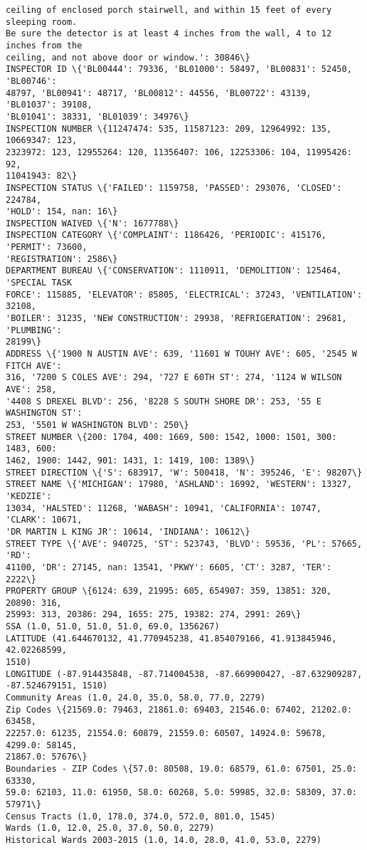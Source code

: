 \documentclass[11pt]{article}
\begin{document}
\begin{Verbatim}[commandchars=\\\{\}]
ceiling of enclosed porch stairwell, and within 15 feet of every sleeping room.
Be sure the detector is at least 4 inches from the wall, 4 to 12 inches from the
ceiling, and not above door or window.': 30846\}
INSPECTOR ID \{'BL00444': 79336, 'BL01000': 58497, 'BL00831': 52450, 'BL00746':
48797, 'BL00941': 48717, 'BL00812': 44556, 'BL00722': 43139, 'BL01037': 39108,
'BL01041': 38331, 'BL01039': 34976\}
INSPECTION NUMBER \{11247474: 535, 11587123: 209, 12964992: 135, 10669347: 123,
2323972: 123, 12955264: 120, 11356407: 106, 12253306: 104, 11995426: 92,
11041943: 82\}
INSPECTION STATUS \{'FAILED': 1159758, 'PASSED': 293076, 'CLOSED': 224784,
'HOLD': 154, nan: 16\}
INSPECTION WAIVED \{'N': 1677788\}
INSPECTION CATEGORY \{'COMPLAINT': 1186426, 'PERIODIC': 415176, 'PERMIT': 73600,
'REGISTRATION': 2586\}
DEPARTMENT BUREAU \{'CONSERVATION': 1110911, 'DEMOLITION': 125464, 'SPECIAL TASK
FORCE': 115885, 'ELEVATOR': 85805, 'ELECTRICAL': 37243, 'VENTILATION': 32108,
'BOILER': 31235, 'NEW CONSTRUCTION': 29938, 'REFRIGERATION': 29681, 'PLUMBING':
28199\}
ADDRESS \{'1900 N AUSTIN AVE': 639, '11601 W TOUHY AVE': 605, '2545 W FITCH AVE':
316, '7200 S COLES AVE': 294, '727 E 60TH ST': 274, '1124 W WILSON AVE': 258,
'4408 S DREXEL BLVD': 256, '8228 S SOUTH SHORE DR': 253, '55 E WASHINGTON ST':
253, '5501 W WASHINGTON BLVD': 250\}
STREET NUMBER \{200: 1704, 400: 1669, 500: 1542, 1000: 1501, 300: 1483, 600:
1462, 1900: 1442, 901: 1431, 1: 1419, 100: 1389\}
STREET DIRECTION \{'S': 683917, 'W': 500418, 'N': 395246, 'E': 98207\}
STREET NAME \{'MICHIGAN': 17980, 'ASHLAND': 16992, 'WESTERN': 13327, 'KEDZIE':
13034, 'HALSTED': 11268, 'WABASH': 10941, 'CALIFORNIA': 10747, 'CLARK': 10671,
'DR MARTIN L KING JR': 10614, 'INDIANA': 10612\}
STREET TYPE \{'AVE': 940725, 'ST': 523743, 'BLVD': 59536, 'PL': 57665, 'RD':
41100, 'DR': 27145, nan: 13541, 'PKWY': 6605, 'CT': 3287, 'TER': 2222\}
PROPERTY GROUP \{6124: 639, 21995: 605, 654907: 359, 13851: 320, 20890: 316,
25993: 313, 20386: 294, 1655: 275, 19382: 274, 2991: 269\}
SSA (1.0, 51.0, 51.0, 51.0, 69.0, 1356267)
LATITUDE (41.644670132, 41.770945238, 41.854079166, 41.913845946, 42.02268599,
1510)
LONGITUDE (-87.914435848, -87.714004538, -87.669900427, -87.632909287,
-87.524679151, 1510)
Community Areas (1.0, 24.0, 35.0, 58.0, 77.0, 2279)
Zip Codes \{21569.0: 79463, 21861.0: 69403, 21546.0: 67402, 21202.0: 63458,
22257.0: 61235, 21554.0: 60879, 21559.0: 60507, 14924.0: 59678, 4299.0: 58145,
21867.0: 57676\}
Boundaries - ZIP Codes \{57.0: 80508, 19.0: 68579, 61.0: 67501, 25.0: 63330,
59.0: 62103, 11.0: 61950, 58.0: 60268, 5.0: 59985, 32.0: 58309, 37.0: 57971\}
Census Tracts (1.0, 178.0, 374.0, 572.0, 801.0, 1545)
Wards (1.0, 12.0, 25.0, 37.0, 50.0, 2279)
Historical Wards 2003-2015 (1.0, 14.0, 28.0, 41.0, 53.0, 2279)
    \end{Verbatim}
\end{document}
